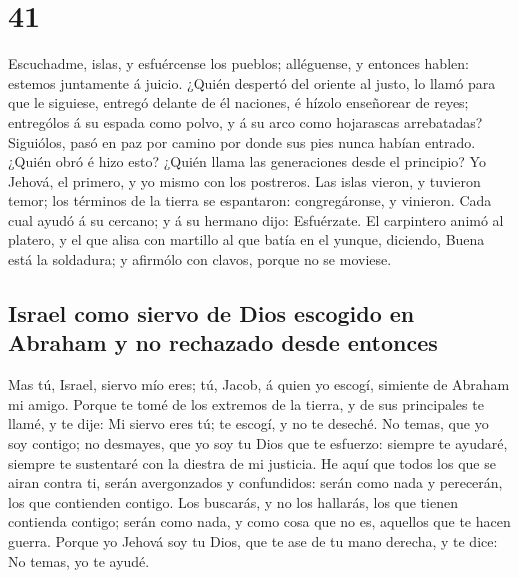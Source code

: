 \hypertarget{section-40}{%
\section{41}\label{section-40}}

 Escuchadme, islas, y esfuércense los pueblos; alléguense,
y entonces hablen: estemos juntamente á juicio.  ¿Quién
despertó del oriente al justo, lo llamó para que le siguiese, entregó
delante de él naciones, é hízolo enseñorear de reyes; entrególos á su
espada como polvo, y á su arco como hojarascas arrebatadas?
 Siguiólos, pasó en paz por camino por donde sus pies
nunca habían entrado.  ¿Quién obró é hizo esto? ¿Quién
llama las generaciones desde el principio? Yo Jehová, el primero, y yo
mismo con los postreros.  Las islas vieron, y tuvieron
temor; los términos de la tierra se espantaron: congregáronse, y
vinieron.  Cada cual ayudó á su cercano; y á su hermano
dijo: Esfuérzate.  El carpintero animó al platero, y el
que alisa con martillo al que batía en el yunque, diciendo, Buena está
la soldadura; y afirmólo con clavos, porque no se moviese.

\hypertarget{israel-como-siervo-de-dios-escogido-en-abraham-y-no-rechazado-desde-entonces}{%
\subsection{Israel como siervo de Dios escogido en Abraham y no
rechazado desde
entonces}\label{israel-como-siervo-de-dios-escogido-en-abraham-y-no-rechazado-desde-entonces}}

 Mas tú, Israel, siervo mío eres; tú, Jacob, á quien yo
escogí, simiente de Abraham mi amigo.  Porque te tomé de
los extremos de la tierra, y de sus principales te llamé, y te dije: Mi
siervo eres tú; te escogí, y no te deseché.  No temas,
que yo soy contigo; no desmayes, que yo soy tu Dios que te esfuerzo:
siempre te ayudaré, siempre te sustentaré con la diestra de mi justicia.
 He aquí que todos los que se airan contra ti, serán
avergonzados y confundidos: serán como nada y perecerán, los que
contienden contigo.  Los buscarás, y no los hallarás, los
que tienen contienda contigo; serán como nada, y como cosa que no es,
aquellos que te hacen guerra.  Porque yo Jehová soy tu
Dios, que te ase de tu mano derecha, y te dice: No temas, yo te ayudé.

